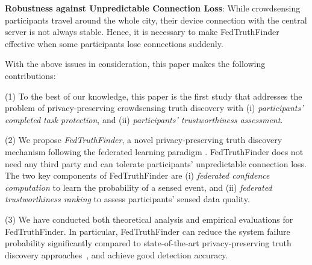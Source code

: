 \textbf{Robustness against Unpredictable Connection Loss}: While crowdsensing participants travel around the whole city, their device connection with the central server is not always stable. Hence, it is necessary to make FedTruthFinder effective when some participants lose connections suddenly.



With the above issues in consideration, this paper makes the following contributions:

(1) To the best of our knowledge, this paper is the first study that addresses the problem of privacy-preserving crowdsensing truth discovery with (i) \textit{participants' completed task protection}, and (ii) \textit{participants' trustworthiness assessment}.

(2) We propose \textit{FedTruthFinder}, a novel privacy-preserving truth discovery mechanism following the federated learning paradigm \citep{yang2019federated}. FedTruthFinder does not need any third party and can tolerate participants' unpredictable connection loss. The two key components of FedTruthFinder are (i) \textit{federated confidence computation} to learn the probability of a sensed event, and (ii) \textit{federated trustworthiness ranking} to assess participants' sensed data quality.

(3) We have conducted both theoretical analysis and empirical evaluations for FedTruthFinder. In particular, FedTruthFinder can reduce the system failure probability significantly compared to state-of-the-art privacy-preserving truth discovery approaches~\citep{Bonawitz2017PracticalSA,Xu2019EfficientAP}, and achieve good detection accuracy.
